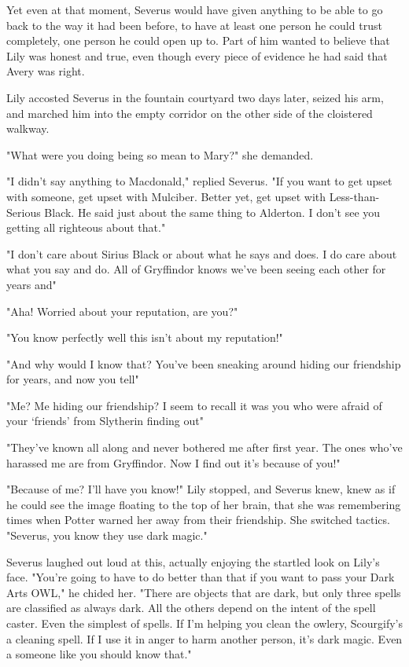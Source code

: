 Yet even at that moment, Severus would have given anything to be able to go back to the way it had been before, to have at least one person he could trust completely, one person he could open up to. Part of him wanted to believe that Lily was honest and true, even though every piece of evidence he had said that Avery was right.

Lily accosted Severus in the fountain courtyard two days later, seized his arm, and marched him into the empty corridor on the other side of the cloistered walkway.

"What were you doing being so mean to Mary?" she demanded.

"I didn't say anything to Macdonald," replied Severus. "If you want to get upset with someone, get upset with Mulciber. Better yet, get upset with Less-than-Serious Black. He said just about the same thing to Alderton. I don't see you getting all righteous about that."

"I don't care about Sirius Black or about what he says and does. I do care about what you say and do. All of Gryffindor knows we've been seeing each other for years and{\el}"

"Aha! Worried about your reputation, are you?"

"You know perfectly well this isn't about my reputation!"

"And why would I know that? You've been sneaking around hiding our friendship for years, and now you tell{\el}"

"Me? Me hiding our friendship? I seem to recall it was you who were afraid of your `friends' from Slytherin finding out{\el}"

"They've known all along and never bothered me after first year. The ones who've harassed me are from Gryffindor. Now I find out it's because of you!"

"Because of me? I'll have you know{\el}!" Lily stopped, and Severus knew, knew as if he could see the image floating to the top of her brain, that she was remembering times when Potter warned her away from their friendship. She switched tactics. "Severus, you know they use dark magic."

Severus laughed out loud at this, actually enjoying the startled look on Lily's face. "You're going to have to do better than that if you want to pass your Dark Arts OWL," he chided her. "There are objects that are dark, but only three spells are classified as always dark. All the others depend on the intent of the spell caster. Even the simplest of spells. If I'm helping you clean the owlery, Scourgify's a cleaning spell. If I use it in anger to harm another person, it's dark magic. Even a{\el} someone like you should know that."

